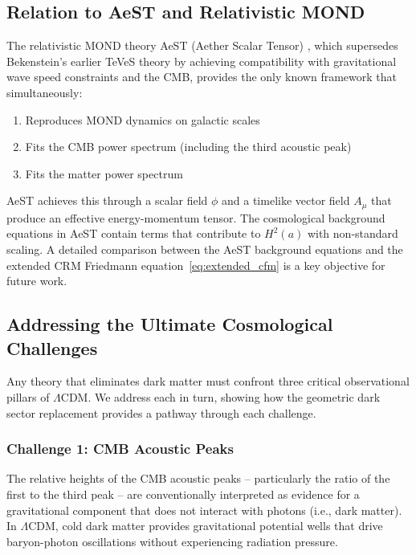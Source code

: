 \documentclass[aps,prd,twocolumn,superscriptaddress,nofootinbib,floatfix]{revtex4-2}
\begin{document}
\subsection{Relation to AeST and Relativistic MOND}

The relativistic MOND theory AeST (Aether Scalar Tensor) \cite{Skordis2021}, which supersedes Bekenstein's earlier TeVeS theory \cite{Bekenstein2004} by achieving compatibility with gravitational wave speed constraints and the CMB, provides the only known framework that simultaneously:
\begin{enumerate}
\item Reproduces MOND dynamics on galactic scales
\item Fits the CMB power spectrum (including the third acoustic peak)
\item Fits the matter power spectrum
\end{enumerate}

AeST achieves this through a scalar field $\phi$ and a timelike vector field $A_\mu$ that produce an effective energy-momentum tensor. The cosmological background equations in AeST contain terms that contribute to $H^2(a)$ with non-standard scaling. A detailed comparison between the AeST background equations and the extended CRM Friedmann equation~\eqref{eq:extended_cfm} is a key objective for future work.

\subsection{Addressing the Ultimate Cosmological Challenges}
\label{subsec:endgegner}

Any theory that eliminates dark matter must confront three critical observational pillars of $\Lambda$CDM. We address each in turn, showing how the geometric dark sector replacement provides a pathway through each challenge.

\subsubsection{Challenge 1: CMB Acoustic Peaks}

The relative heights of the CMB acoustic peaks -- particularly the ratio of the first to the third peak -- are conventionally interpreted as evidence for a gravitational component that does not interact with photons (i.e., dark matter). In $\Lambda$CDM, cold dark matter provides gravitational potential wells that drive baryon-photon oscillations without experiencing radiation pressure.
\end{document}
